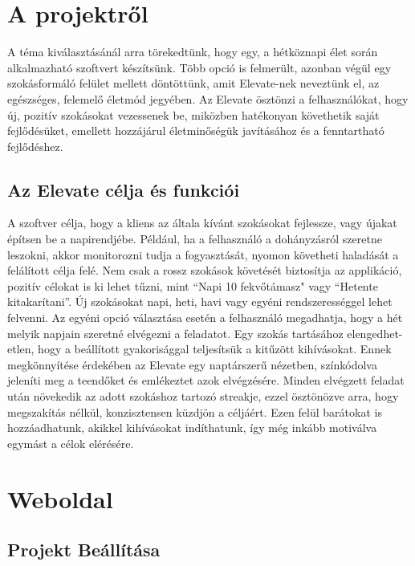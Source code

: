 \documentclass[12pt]{report}
\begin{document}


\setcounter{tocdepth}{3}
\tableofcontents

\chapter{A projektről}
\begin{sloppypar}
A téma kiválasztásánál arra törekedtünk, hogy egy, a hétköznapi élet során alkalmazható szoftvert készítsünk. Több opció is felmerült, azonban végül egy szokásformáló felület mellett döntöttünk, amit Elevate-nek neveztünk el, az egészséges, felemelő életmód jegyében. Az Elevate ösztönzi a felhasználókat, hogy új, pozitív szokásokat vezessenek be, miközben hatékonyan követhetik saját fejlődésüket, emellett hozzájárul életminőségük javításához és a fenntartható fejlődéshez.
\end{sloppypar}
\section{Az Elevate célja és funkciói}
\begin{sloppypar}
A szoftver célja, hogy a kliens az általa kívánt szokásokat fejlessze, vagy újakat építsen be a napirendjébe. Például, ha a felhasználó a dohányzásról szeretne leszokni, akkor monitorozni tudja a fogyasztását, nyomon követheti haladását a felálított célja felé. Nem csak a rossz szokások követését biztosítja az applikáció, pozitív célokat is ki lehet tűzni, mint “Napi 10 fekvőtámasz" vagy “Hetente kitakarítani”. Új szokásokat napi, heti, havi vagy egyéni rendszerességgel lehet felvenni. Az egyéni opció választása esetén a felhasználó megadhatja, hogy a hét melyik napjain szeretné elvégezni a feladatot. Egy szokás tartásához elengedhet-etlen, hogy a beállított gyakorisággal teljesítsük a kitűzött kihívásokat. Ennek megkönnyítése érdekében az Elevate egy naptárszerű nézetben, színkódolva jeleníti meg a teendőket és emlékeztet azok elvégzésére. Minden elvégzett feladat után növekedik az adott szokáshoz tartozó streakje, ezzel ösztönözve arra, hogy megszakítás nélkül, konzisztensen küzdjön a céljáért. Ezen felül barátokat is hozzáadhatunk, akikkel kihívásokat indíthatunk, így még inkább motiválva egymást a célok elérésére.
\end{sloppypar}
\chapter{Weboldal}
\section{Projekt Beállítása}
\end{document}
